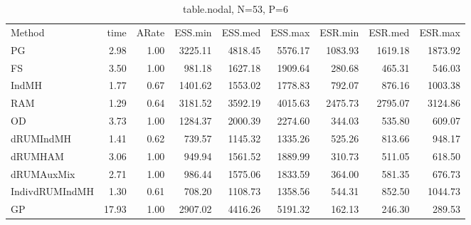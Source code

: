 
\begin{table}
\begin{tabular}{l r r r r r r r r } 
          Method  &     time &    ARate &  ESS.min &  ESS.med &  ESS.max &  ESR.min &  ESR.med &  ESR.max \\ 
              PG  &     2.98 &     1.00 &  3225.11 &  4818.45 &  5576.17 &  1083.93 &  1619.18 &  1873.92 \\ 
              FS  &     3.50 &     1.00 &   981.18 &  1627.18 &  1909.64 &   280.68 &   465.31 &   546.03 \\ 
           IndMH  &     1.77 &     0.67 &  1401.62 &  1553.02 &  1778.83 &   792.07 &   876.16 &  1003.38 \\ 
             RAM  &     1.29 &     0.64 &  3181.52 &  3592.19 &  4015.63 &  2475.73 &  2795.07 &  3124.86 \\ 
              OD  &     3.73 &     1.00 &  1284.37 &  2000.39 &  2274.60 &   344.03 &   535.80 &   609.07 \\ 
       dRUMIndMH  &     1.41 &     0.62 &   739.57 &  1145.32 &  1335.26 &   525.26 &   813.66 &   948.17 \\ 
         dRUMHAM  &     3.06 &     1.00 &   949.94 &  1561.52 &  1889.99 &   310.73 &   511.05 &   618.50 \\ 
      dRUMAuxMix  &     2.71 &     1.00 &   986.44 &  1575.06 &  1833.59 &   364.00 &   581.35 &   676.73 \\ 
  IndivdRUMIndMH  &     1.30 &     0.61 &   708.20 &  1108.73 &  1358.56 &   544.31 &   852.50 &  1044.73 \\ 
              GP  &    17.93 &     1.00 &  2907.02 &  4416.26 &  5191.32 &   162.13 &   246.30 &   289.53
 \end{tabular}
\caption{table.nodal, N=53, P=6}
\end{table}


